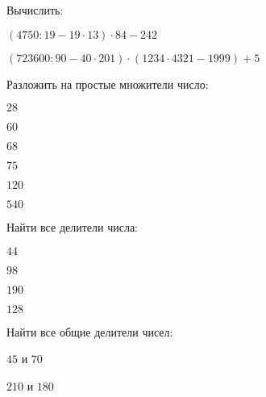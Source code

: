 \documentclass[12pt, a4paper]{article}
\begin{document}
\begin{enumcols}[label=\textbf{\arabic*.}]
	\item Вычислить:
	\begin{enumcols}[itemcolumns=1]
		\item \( (4750:19-19\cdot13)\cdot84 -242 \)
		\item \( (723600:90-40\cdot201)\cdot(1234\cdot4321-1999)+5 \)
	\end{enumcols}
	\item Разложить на простые множители число:
	\begin{enumcols}[itemcolumns=6]
		\item \( 28 \)
		\item \( 60 \)
		\item \( 68 \)
		\item \( 75 \)
		\item \( 120 \)
		\item \( 540 \)
	\end{enumcols}
	\item Найти все делители числа:
	\begin{enumcols}[itemcolumns=6]
		\item \( 44 \)
		\item \( 98 \)
		\item \( 190 \)
		\item \( 128 \)
	\end{enumcols}
	\item Найти все общие делители чисел:
	\begin{enumcols}[itemcolumns=2]
		\item \( 45 \) и \( 70 \)
		\item \( 210 \) и \( 180 \)
	\end{enumcols}
\end{enumcols}
\end{document}
